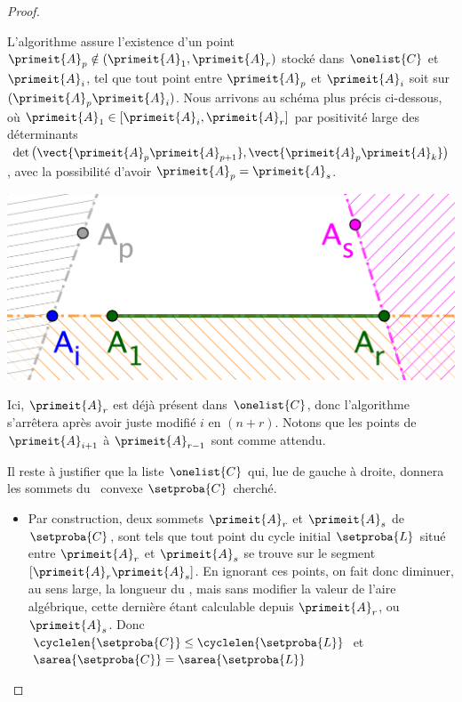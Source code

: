 \begin{proof}
\begin{itemize}
        \noindent
        L'algorithme assure l'existence d'un point $\primeit{A}_p \notin ( \primeit{A}_1 , \primeit{A}_r )$ stocké dans $\onelist{C}$ et  $\primeit{A}_i$,
        tel que tout point entre $\primeit{A}_p$ et $\primeit{A}_i$ soit sur $(\primeit{A}_p \primeit{A}_i)$.
        Nous arrivons au schéma plus précis ci-dessous, où
        $\primeit{A}_1 \in [ \primeit{A}_i , \primeit{A}_r ]$
        par positivité large des déterminants
        $\det \big( \vect{\primeit{A}_p \primeit{A}_{p+1}}, \vect{\primeit{A}_p \primeit{A}_k} \big)$,
        avec la possibilité d'avoir $\primeit{A}_p = \primeit{A}_s$.
        \begin{center}
        	\includegraphics[scale=.4]{content/polygon/at-least-one/algo-kgone-terminate-3.png}
        \end{center}
        
        \noindent
        Ici,
        $\primeit{A}_r$ est déjà présent dans $\onelist{C}$,
        donc l'algorithme s'arrêtera après avoir juste modifié $i$ en $(n + r)$.
        Notons que les points de $\primeit{A}_{i+1}$ à $\primeit{A}_{r-1}$ sont  comme attendu.
    \end{itemize}
    
    
    \medskip
    
    
    Il reste à justifier que la liste $\onelist{C}$ qui, lue de gauche à droite, donnera les sommets du \kgone\ convexe $\setproba{C}$ cherché.
    \begin{itemize}
        \item Par construction, deux sommets  $\primeit{A}_r$ et $\primeit{A}_s$ de $\setproba{C}$, sont tels que tout point du cycle initial $\setproba{L}$ situé entre $\primeit{A}_r$ et $\primeit{A}_s$ se trouve sur le segment $[\primeit{A}_r \primeit{A}_s]$.
        En ignorant ces points, on fait donc diminuer, au sens large, la longueur du \ncycle, mais sans modifier la valeur de l'aire algébrique, cette dernière étant calculable depuis $\primeit{A}_r$, ou $\primeit{A}_s$.
        Donc
        $\cyclelen{\setproba{C}} \leq \cyclelen{\setproba{L}}$
		et
		$\sarea{\setproba{C}} = \sarea{\setproba{L}}$



\end{itemize}
\end{proof}
